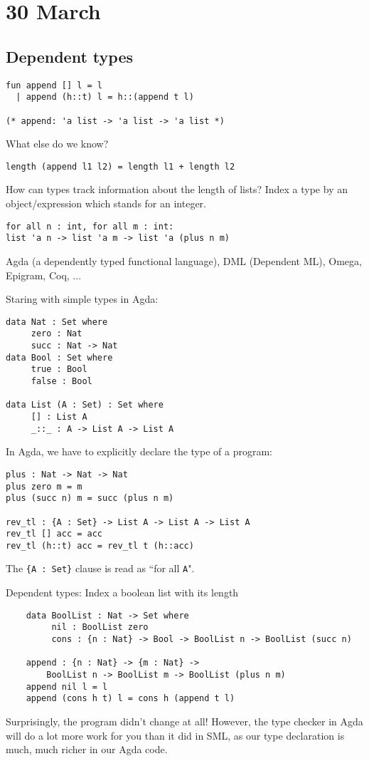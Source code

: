 \documentclass[11pt]{article}
\begin{document}
\section{30 March}
\subsection{Dependent types}
\begin{verbatim}
fun append [] l = l
  | append (h::t) l = h::(append t l)

(* append: 'a list -> 'a list -> 'a list *)
\end{verbatim}
What else do we know?

\begin{verbatim}
length (append l1 l2) = length l1 + length l2
\end{verbatim}

How can types track information about the length of lists? Index a type by an object/expression which stands for an integer. 
\begin{verbatim}
for all n : int, for all m : int:
list 'a n -> list 'a m -> list 'a (plus n m)
\end{verbatim}

Agda (a dependently typed functional language), DML (Dependent ML), Omega, Epigram, Coq, ...

Staring with simple types in Agda:
\begin{verbatim}
data Nat : Set where
     zero : Nat
     succ : Nat -> Nat
data Bool : Set where
     true : Bool
     false : Bool

data List (A : Set) : Set where
     [] : List A
     _::_ : A -> List A -> List A
\end{verbatim}

In Agda, we have to explicitly declare the type of a program:
\begin{verbatim}
plus : Nat -> Nat -> Nat
plus zero m = m
plus (succ n) m = succ (plus n m)

rev_tl : {A : Set} -> List A -> List A -> List A
rev_tl [] acc = acc
rev_tl (h::t) acc = rev_tl t (h::acc)
\end{verbatim}

The \verb~{A : Set}~ clause is read as ``for all \verb~A~".

Dependent types:
Index a boolean list with its length
\begin{verbatim}
    data BoolList : Nat -> Set where
         nil : BoolList zero
         cons : {n : Nat} -> Bool -> BoolList n -> BoolList (succ n)
    
    append : {n : Nat} -> {m : Nat} -> 
        BoolList n -> BoolList m -> BoolList (plus n m)
    append nil l = l
    append (cons h t) l = cons h (append t l)
\end{verbatim} 
Surprisingly, the program didn't change at all! However, the type checker in Agda will do a lot more work for you than it did in SML, as our type declaration is much, much richer in our Agda code.
\end{document}
